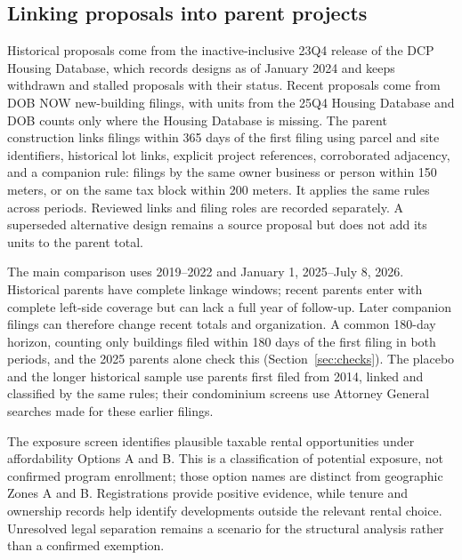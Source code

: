 \documentclass[11pt]{article}
\begin{document}
\subsection{Linking proposals into parent projects}
Historical proposals come from the inactive-inclusive 23Q4 release of the DCP Housing Database, which records designs as of January 2024 and keeps withdrawn and stalled proposals with their status. Recent proposals come from DOB NOW new-building filings, with units from the 25Q4 Housing Database and DOB counts only where the Housing Database is missing. The parent construction links filings within 365 days of the first filing using parcel and site identifiers, historical lot links, explicit project references, corroborated adjacency, and a companion rule: filings by the same owner business or person within 150 meters, or on the same tax block within 200 meters. It applies the same rules across periods. Reviewed links and filing roles are recorded separately. A superseded alternative design remains a source proposal but does not add its units to the parent total.

The main comparison uses 2019--2022 and January 1, 2025--July 8, 2026. Historical parents have complete linkage windows; recent parents enter with complete left-side coverage but can lack a full year of follow-up. Later companion filings can therefore change recent totals and organization. A common 180-day horizon, counting only buildings filed within 180 days of the first filing in both periods, and the 2025 parents alone check this (Section~\ref{sec:checks}). The placebo and the longer historical sample use parents first filed from 2014, linked and classified by the same rules; their condominium screens use Attorney General searches made for these earlier filings.

The exposure screen identifies plausible taxable rental opportunities under affordability Options A and B. This is a classification of potential exposure, not confirmed program enrollment; those option names are distinct from geographic Zones A and B. Registrations provide positive evidence, while tenure and ownership records help identify developments outside the relevant rental choice. Unresolved legal separation remains a scenario for the structural analysis rather than a confirmed exemption.
\end{document}
